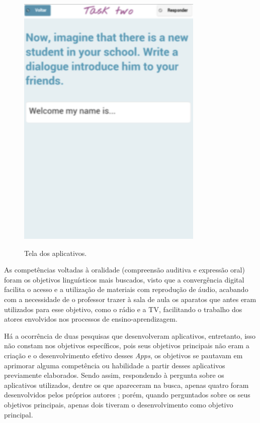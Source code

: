 \documentclass{textolivre}
\begin{document}
\begin{figure}[htbp]
\begin{minipage}[t]{0.35\textwidth}
\includegraphics[width=\linewidth]{fig10.png}
\label{fig10}
\end{minipage}
\caption{Tela dos aplicativos.}
\label{fig9e10}
\end{figure}



As competências voltadas à oralidade (compreensão auditiva e expressão oral) foram os objetivos linguísticos mais buscados, visto que a convergência digital \cite{jenkins2008} facilita o acesso e a utilização de materiais com reprodução de áudio, acabando com a necessidade de o professor trazer à sala de aula os aparatos que antes eram utilizados para esse objetivo, como o rádio e a TV, facilitando o trabalho dos atores envolvidos nos processos de ensino-aprendizagem. 

Há a ocorrência de duas pesquisas que desenvolveram aplicativos, entretanto, isso não constam nos objetivos específicos, pois seus objetivos principais não eram a criação e o desenvolvimento efetivo desses \textit{Apps}, os objetivos se pautavam em aprimorar alguma competência ou habilidade a partir desses aplicativos previamente elaborados. Sendo assim, respondendo à pergunta sobre os aplicativos utilizados, dentre os que apareceram na busca, apenas quatro foram desenvolvidos pelos próprios autores \cite{rodrigues2014, liz2015, redondo2017, lu2014}; porém, quando perguntados sobre os seus objetivos principais, apenas dois \cite{rodrigues2014, liz2015} tiveram o desenvolvimento como objetivo principal.
	
\end{document}
